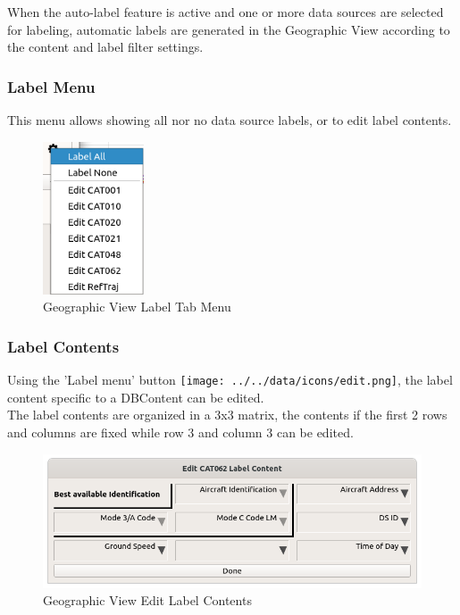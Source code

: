 When the auto-label feature is active and one or more data sources are selected for labeling, automatic labels are generated in the Geographic View according to the content and label filter settings. \\

\subsubsection{Label Menu}

This menu allows showing all nor no data source labels, or to edit label contents.

\begin{figure}[H]
   \center
    \includegraphics[width=3cm,frame]{figures/geoview_label_tab_menu.png}
  \caption{Geographic View Label Tab Menu}
\end{figure}

\subsubsection{Label Contents}

Using the 'Label menu' button \texttt{[image: ../../data/icons/edit.png]}, the label content specific to a DBContent can be edited. \\

The label contents are organized in a 3x3 matrix, the contents if the first 2 rows and columns are fixed while row 3 and column 3 can be edited. 

\begin{figure}[H]
   \center
    \includegraphics[width=14cm]{figures/geoview_label_content_edit.png}
  \caption{Geographic View Edit Label Contents}
\end{figure}

